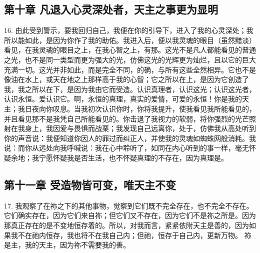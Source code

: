 
\subsection{第十章 凡退入心灵深处者，天主之事更为显明}

16. 由此受到警示，要我回归自己，我便在你的引导下，进入了我的心灵深处；我所以能如此，是因为你作了我的助佑。我进入后，便以我灵魂的眼目（虽然黯淡）看见，在我灵魂的眼目之上，在我心智之上，有那。这光不是凡人都能看见的普通之光，也不是同一类型而更为强大的光，仿佛这光的光辉更为灿烂，且以它的巨大充满一切。这光并非如此，而是完全不同，的确，与所有这些全然相异。它也不是像油在水上，或天在地之上那样高于我的心智；它之所以在上，是因为它创造了我，我之所以在下，是因为我由它而受造。认识真理者，认识这光；认识这光者，认识永恒。爱认识它。啊，永恒的真理，真实的爱情，可爱的永恒！你是我的天主；我日夜向你叹息。当我初次认识你时，你将我提升，使我看见我所能看见的，并且看见那不是我凭自己所能看见的。你击退了我视力的软弱，将你强烈的光芒照射在我身上，我因爱与畏惧而战栗；我发现自己远离你，处于，仿佛我从高处听到你的声音说：我便知道你因人的罪过而纠正人，并使我的灵魂如蜘蛛网般消耗。我说：而你从远处向我呼喊说：我在心中聆听了，如同在内心听到的事一样，毫无怀疑余地；我宁愿怀疑我是否生活，也不怀疑真理的不存在，因为真理是。\par


\subsection{第十一章 受造物皆可变，唯天主不变}

17. 我观察了在祢之下的其他事物，觉察到它们既不完全存在，也不完全不存在。它们确实存在，因为它们来自祢；但它们又不存在，因为它们不是祢之所是。因为那真正存在的是不变地恒存着的。所以，对我而言，紧紧依附天主是善的，因为如果我不在祂内恒存，我也将不在我自己内；但祂，恒存于自己内，更新万物。 祢是主，我的天主，因为祢不需要我的善。\par

